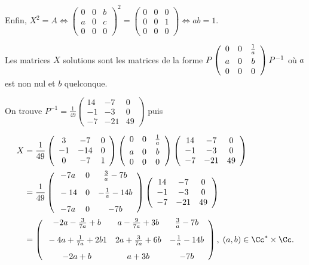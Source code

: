 {{Enfin, $X^2=A\Leftrightarrow\left(
\begin{array}{ccc}
0&0&b\\
a&0&c\\
0&0&0
\end{array}
\right)^2=\left(
\begin{array}{ccc}
0&0&0\\
0&0&1\\
0&0&0
\end{array}
\right)\Leftrightarrow ab = 1$.

Les matrices $X$ solutions sont les matrices de la forme $P\left(
\begin{array}{ccc}
0&0&\frac{1}{a}\\
a&0&b\rule{0mm}{4mm}\\
0&0&0
\end{array}
\right)P^{-1}$ où $a$ est non nul et $b$ quelconque.

On trouve $P^{-1}=\frac{1}{49}\left(
\begin{array}{ccc}
14&-7&0\\
-1&-3&0\\
-7&-21&49
\end{array}
\right)$  puis

\begin{align*}\ensuremath
X&=\frac{1}{49}\left(
\begin{array}{ccc}
3&-7&0\\
-1&-14&0\\
0&-7&1
\end{array}
\right)\left(
\begin{array}{ccc}
0&0&\frac{1}{a}\\
a&0&b\rule{0mm}{4mm}\\
0&0&0
\end{array}
\right)\left(
\begin{array}{ccc}
14&-7&0\\
-1&-3&0\\
-7&-21&49
\end{array}
\right)\\
 &=\frac{1}{49}\left(
\begin{array}{ccc}
-7a&0&\frac{3}{a}-7b\\
\rule[-4mm]{0mm}{10mm}-14&0&-\frac{1}{a}-14b\\
-7a&0&-7b
\end{array}
\right)\left(
\begin{array}{ccc}
14&-7&0\\
-1&-3&0\\
-7&-21&49
\end{array}
\right)\\
&=\left(
\begin{array}{ccc}
-2a-\frac{3}{7a}+b&a-\frac{9}{7a}+3b&\frac{3}{a}-7b\\
\rule[-4mm]{0mm}{10mm}-4a+\frac{1}{7a}+2b1&2a+\frac{3}{7a}+6b&-\frac{1}{a}-14b\\
-2a+b&a+3b&-7b
\end{array}
\right),\;(a,b)\in\Cc^*\times\Cc.
\end{align*}
}
}
